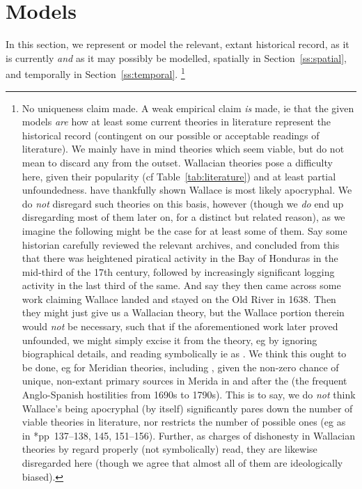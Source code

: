 \section{Models}
\label{s:models}
	In this section, we represent or model the relevant, extant historical record, as it is currently \emph{and} as it may possibly be modelled, spatially in Section~\ref{ss:spatial}, and temporally in Section~\ref{ss:temporal}.%
	\footnote{No uniqueness claim made. A weak empirical claim \emph{is} made, ie that the given models \emph{are} how at least some current theories in literature represent the historical record (contingent on our possible or acceptable readings of literature). We mainly have in mind theories which seem viable, but do not mean to discard any from the outset. Wallacian theories pose a difficulty here, given their popularity (cf Table~\ref{tab:literature}) and at least partial unfoundedness.  have thankfully shown Wallace is most likely apocryphal. We do \emph{not} disregard such theories on this basis, however (though we \emph{do} end up disregarding most of them later on, for a distinct but related reason), as we imagine the following might be the case for at least some of them. Say some historian carefully reviewed the relevant archives, and concluded from this that there was heightened piratical activity in the Bay of Honduras in the mid-third of the 17th century, followed by increasingly significant logging activity in the last third of the same. And say they then came across some work claiming Wallace landed and stayed on the Old River in 1638. Then they might just give us a Wallacian theory, but the Wallace portion therein would \emph{not} be necessary, such that if the aforementioned work later proved unfounded, we might simply excise it from the theory, eg by ignoring biographical details, and reading  symbolically ie as . We think this ought to be done, eg for Meridian theories, including , given the non-zero chance of unique, non-extant primary sources in Merida in and after the  (the frequent Anglo-Spanish hostilities from 1690s to 1790s). This is to say, we do \emph{not} think Wallace's being apocryphal (by itself) significantly pares down the number of viable theories in literature, nor restricts the number of possible ones (eg as in \cite{bul16}*{pp~137--138, 145, 151--156}). Further, as charges of dishonesty in Wallacian theories by  regard  properly (not symbolically) read, they are likewise disregarded here (though we agree that almost all of them are ideologically biased).} %
	
